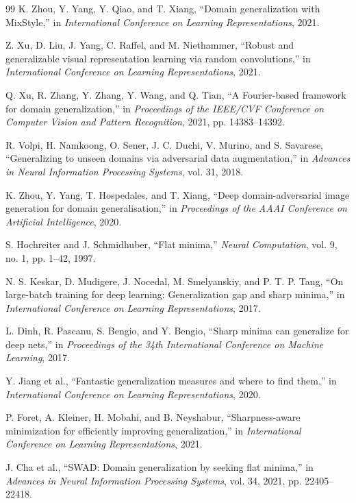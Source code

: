 \documentclass[11pt,a4paper]{article}
\begin{document}
\begin{thebibliography}{99}
K. Zhou, Y. Yang, Y. Qiao, and T. Xiang,
``Domain generalization with MixStyle,''
in \emph{International Conference on Learning Representations}, 2021.

Z. Xu, D. Liu, J. Yang, C. Raffel, and M. Niethammer,
``Robust and generalizable visual representation learning via random convolutions,''
in \emph{International Conference on Learning Representations}, 2021.

Q. Xu, R. Zhang, Y. Zhang, Y. Wang, and Q. Tian,
``A Fourier-based framework for domain generalization,''
in \emph{Proceedings of the IEEE/CVF Conference on Computer Vision and Pattern Recognition}, 2021, pp. 14383--14392.

R. Volpi, H. Namkoong, O. Sener, J. C. Duchi, V. Murino, and S. Savarese,
``Generalizing to unseen domains via adversarial data augmentation,''
in \emph{Advances in Neural Information Processing Systems}, vol. 31, 2018.

K. Zhou, Y. Yang, T. Hospedales, and T. Xiang,
``Deep domain-adversarial image generation for domain generalisation,''
in \emph{Proceedings of the AAAI Conference on Artificial Intelligence}, 2020.

S. Hochreiter and J. Schmidhuber,
``Flat minima,'' \emph{Neural Computation}, vol. 9, no. 1, pp. 1--42, 1997.

N. S. Keskar, D. Mudigere, J. Nocedal, M. Smelyanskiy, and P. T. P. Tang,
``On large-batch training for deep learning: Generalization gap and sharp minima,''
in \emph{International Conference on Learning Representations}, 2017.

L. Dinh, R. Pascanu, S. Bengio, and Y. Bengio,
``Sharp minima can generalize for deep nets,''
in \emph{Proceedings of the 34th International Conference on Machine Learning}, 2017.

Y. Jiang et al.,
``Fantastic generalization measures and where to find them,''
in \emph{International Conference on Learning Representations}, 2020.

P. Foret, A. Kleiner, H. Mobahi, and B. Neyshabur,
``Sharpness-aware minimization for efficiently improving generalization,''
in \emph{International Conference on Learning Representations}, 2021.

J. Cha et al.,
``SWAD: Domain generalization by seeking flat minima,''
in \emph{Advances in Neural Information Processing Systems}, vol. 34, 2021, pp. 22405--22418.


\end{thebibliography}
\end{document}

